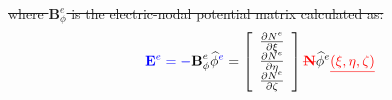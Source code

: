 \documentclass[materials,article,submit,moreauthors,pdftex]{Definitions/mdpi}
\providecommand{\DIFadd}[1]{{\protect\color{blue}{#1}}} %
\providecommand{\DIFdel}[1]{{\protect\color{red}\sout{#1}}}                      %
\providecommand{\DIFaddbegin}{} %
\providecommand{\DIFaddend}{} %
\providecommand{\DIFdelbegin}{} %
\providecommand{\DIFdelend}{} %
\begin{document}
\DIFdel{where \(\textbf{B}_\phi^e\) is the electric-nodal potential matrix calculated as:
}\DIFdelend \DIFaddbegin \DIFadd{The eElectric field is defined as:
}\DIFaddend \begin{eqnarray}
\DIFaddbegin \textbf{\DIFadd{E}}\DIFadd{^e=-}\DIFaddend \textbf{B}_\phi^e \DIFaddbegin \widehat{\phi}\DIFadd{^e }\DIFaddend = \left[ \DIFdelbegin %
\DIFdelend \DIFaddbegin \begin{array}{c}
\frac{\partial N^e}{\partial \xi}\\
\frac{\partial N^e}{\partial \eta}\\
\frac{\partial N^e}{\partial \zeta}
\end{array}\DIFaddend  \right] \DIFdelbegin \textbf{\DIFdel{N}}%
\DIFdelend \DIFaddbegin \widehat{\phi}\DIFaddend ^e
\DIFdelbegin \DIFdel{(\xi,\eta,\zeta)
}\DIFdelend \end{eqnarray}
\end{document}

